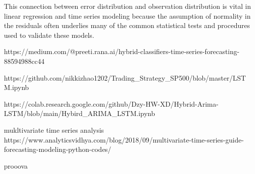 This connection between error distribution and observation distribution is vital in linear regression and time series modeling because the assumption of normality in the residuals often underlies many of the common statistical tests and procedures used to validate these models.



https://medium.com/@preeti.rana.ai/hybrid-classifiers-time-series-forecasting-88594988cc44


https://github.com/nikkizhao1202/Trading_Strategy_SP500/blob/master/LSTM.ipynb


https://colab.research.google.com/github/Dzy-HW-XD/Hybrid-Arima-LSTM/blob/main/Hybird_ARIMA_LSTM.ipynb

mukltivariate time series analysis 
https://www.analyticsvidhya.com/blog/2018/09/multivariate-time-series-guide-forecasting-modeling-python-codes/


prooova